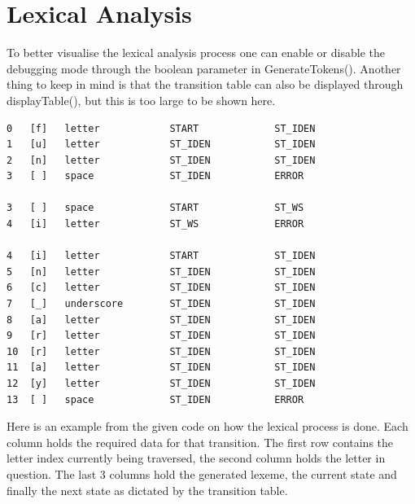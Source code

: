 \documentclass[12pt, a4paper]{report}
\begin{document}
\section{Lexical Analysis}
To better visualise the lexical analysis process one can enable or disable the debugging mode through the boolean parameter in GenerateTokens(). Another thing to keep in mind is that the transition table can also be displayed through displayTable(), but this is too large to be shown here.

\begin{verbatim}
0   [f]   letter            START             ST_IDEN           
1   [u]   letter            ST_IDEN           ST_IDEN           
2   [n]   letter            ST_IDEN           ST_IDEN           
3   [ ]   space             ST_IDEN           ERROR             

3   [ ]   space             START             ST_WS             
4   [i]   letter            ST_WS             ERROR             

4   [i]   letter            START             ST_IDEN           
5   [n]   letter            ST_IDEN           ST_IDEN           
6   [c]   letter            ST_IDEN           ST_IDEN           
7   [_]   underscore        ST_IDEN           ST_IDEN           
8   [a]   letter            ST_IDEN           ST_IDEN           
9   [r]   letter            ST_IDEN           ST_IDEN           
10  [r]   letter            ST_IDEN           ST_IDEN           
11  [a]   letter            ST_IDEN           ST_IDEN           
12  [y]   letter            ST_IDEN           ST_IDEN           
13  [ ]   space             ST_IDEN           ERROR  
\end{verbatim}

Here is an example from the given code on how the lexical process is done. Each column holds the required data for that transition. The first row contains the letter index currently being traversed, the second column holds the letter in question. The last 3 columns hold the generated lexeme, the current state and finally the next state as dictated by the transition table.
\end{document}
